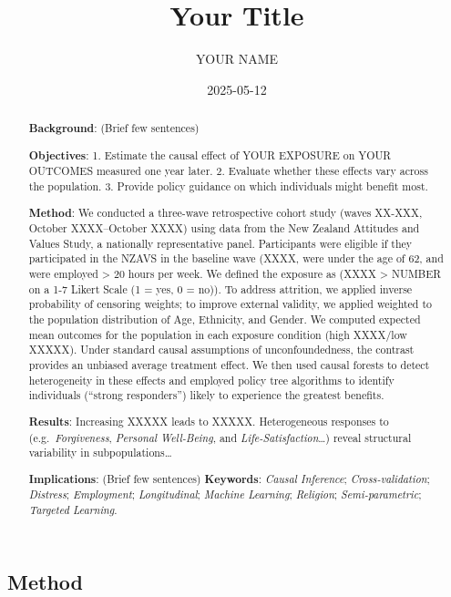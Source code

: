\documentclass[
  single column]{article}
\title{Your Title}
\author{YOUR NAME}
\date{2025-05-12}
\begin{document}
\maketitle
\begin{abstract}
\textbf{Background}: (Brief few sentences)

\textbf{Objectives}: 1. Estimate the causal effect of YOUR EXPOSURE on
YOUR OUTCOMES measured one year later. 2. Evaluate whether these effects
vary across the population. 3. Provide policy guidance on which
individuals might benefit most.

\textbf{Method}: We conducted a three-wave retrospective cohort study
(waves XX-XXX, October XXXX--October XXXX) using data from the New
Zealand Attitudes and Values Study, a nationally representative panel.
Participants were eligible if they participated in the NZAVS in the
baseline wave (XXXX, were under the age of 62, and were employed
\textgreater{} 20 hours per week. We defined the exposure as (XXXX
\textgreater{} NUMBER on a 1-7 Likert Scale (1 = yes, 0 = no)). To
address attrition, we applied inverse probability of censoring weights;
to improve external validity, we applied weighted to the population
distribution of Age, Ethnicity, and Gender. We computed expected mean
outcomes for the population in each exposure condition (high XXXX/low
XXXXX). Under standard causal assumptions of unconfoundedness, the
contrast provides an unbiased average treatment effect. We then used
causal forests to detect heterogeneity in these effects and employed
policy tree algorithms to identify individuals (``strong responders'')
likely to experience the greatest benefits.

\textbf{Results}: Increasing XXXXX leads to XXXXX. Heterogeneous
responses to (e.g.~\emph{Forgiveness}, \emph{Personal Well-Being}, and
\emph{Life-Satisfaction}\ldots) reveal structural variability in
subpopulations\ldots{}

\textbf{Implications}: (Brief few sentences) \textbf{Keywords}:
\emph{Causal Inference}; \emph{Cross-validation}; \emph{Distress};
\emph{Employment}; \emph{Longitudinal}; \emph{Machine Learning};
\emph{Religion}; \emph{Semi-parametric}; \emph{Targeted Learning}.
\end{abstract}


\newpage{}

\subsection{Method}\label{method}
\end{document}
